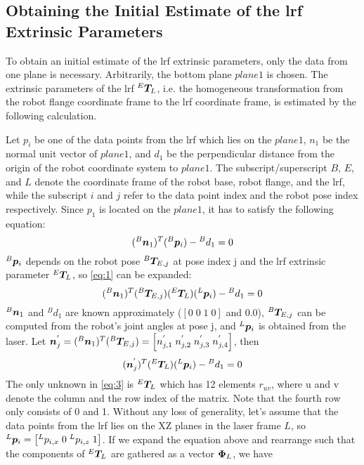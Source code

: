 \subsection{Obtaining the Initial Estimate of the \ac{lrf} Extrinsic Parameters}
\label{sec:first_step}
To obtain an initial estimate of the \ac{lrf} extrinsic parameters, only the data from one plane is necessary. Arbitrarily, the bottom plane $plane 1$ is chosen. The extrinsic parameters of the \ac{lrf} ${^E}\vb*{T}_L$, i.e. the homogeneous transformation from the robot flange coordinate frame to the \ac{lrf} coordinate frame, is estimated by the following calculation. 

Let $p_i$ be one of the data points from the \ac{lrf} which lies on the $plane 1$, $n_1$ be the normal unit vector of $plane 1$, and $d_1$ be the perpendicular distance from the origin of the robot coordinate system to $plane 1$. The subscript/superscript $B$, $E$, and $L$ denote the coordinate frame of the robot base, robot flange, and the \ac{lrf}, while the subscript $i$ and $j$ refer to the data point index and the robot pose index respectively. Since $p_1$ is located on the $plane 1$, it has to satisfy the following equation:
  \begin{equation}
  \label{eq:1}
  ({^B}\vb*{n}_1) ^T ({^B}\vb*{p}_i) - {^B}d_1 = 0
   \end{equation}
${^B}\vb*{p}_i$ depends on the robot pose ${^B}\vb*{T}_{E,j}$ at pose index j and the \ac{lrf} extrinsic parameter ${^E}\vb*{T}_L$, so \eqref{eq:1}  can be expanded:
  \begin{equation}
  ({^B}\vb*{n}_1) ^T ({^B}\vb*{T}_{E,j}) ({^E}\vb*{T}_L) ({^L}\vb*{p}_i) - {^B}d_1 = 0
  \end{equation}
${^B}\vb*{n}_1$ and $^{B}d_1$ are known approximately ($[0 \; 0\; 1\;0]$ and $0.0$), ${^B}\vb*{T}_{E,j}$ can be computed from the robot's joint angles at pose j, and ${^L}\vb*{p}_i$ is obtained from the laser. Let $\vb*{n}^{'}_j = ({^B}\vb*{n}_1) ^T ({^B}\vb*{T}_{E,j}) = 
\left[n^{'}_{j,1} \; n^{'}_{j,2} \; n^{'}_{j,3}  \; n^{'}_{j,4} \right]$, then  
  \begin{equation}
  \label{eq:3}
  (\vb*{n}^{'}_j) ^T ({^E}\vb*{T}_L) ({^L}\vb*{p}_i) - {^B}d_1 = 0
  \end{equation}
The only unknown in \eqref{eq:3} is ${^E}\vb*{T}_L$ which has 12 elements $r_{uv}$, where u and v denote the column and the row index of the matrix. Note that the fourth row only consists of 0 and 1. 
Without any loss of generality, let's assume that the data points from the \ac{lrf} lies on the XZ planes in the laser frame $L$, so ${^L}\vb*{p}_i = \left[{^L}p_{i,x} \; 0 \; {^L}p_{i,z}\; 1\right]$. If we expand the equation above and rearrange such that the components of ${^E}\vb*{T}_L$ are gathered as a vector $\vb*{\Phi}_L$, we have
